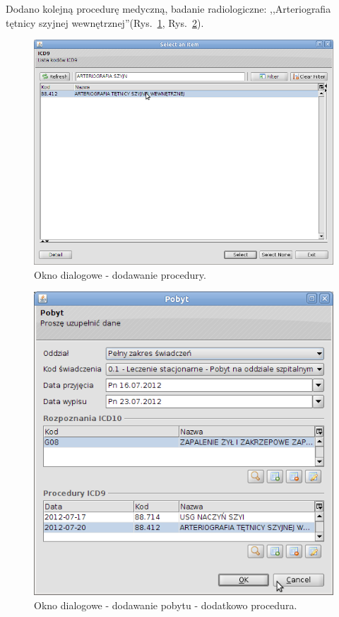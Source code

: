 Dodano kolejną procedurę medyczną, badanie radiologiczne: ,,Arteriografia tętnicy szyjnej wewnętrznej''(Rys.~\ref{img:gruper13}, Rys.~\ref{img:gruper14}).

\begin{figure}%
\centering
\includegraphics[scale=0.4]{images/gruper13}
\caption[Widok grupera]{Okno dialogowe - dodawanie procedury.}
\label{img:gruper13}
\end{figure}

\begin{figure}[!ht]
\centering
\includegraphics[scale=0.4]{images/gruper14}
\caption[Widok grupera]{Okno dialogowe - dodawanie pobytu - dodatkowo procedura.}
\label{img:gruper14}
\end{figure}

